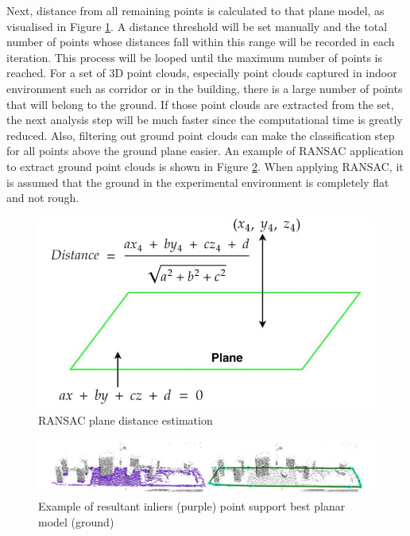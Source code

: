 Next, distance from all remaining points is calculated to that plane model, as visualised in Figure \ref{Chap3:Fig3}. A distance
threshold will be set manually and the total number of points whose distances fall within this range will be recorded in each iteration.
This process will be looped until the maximum number of points is reached. For a set of 3D point clouds, especially point clouds captured
in indoor environment such as corridor or in the building, there is a large number of points that will belong to the ground. If those
point clouds are extracted from the set, the next analysis step will be much faster since the computational
time is greatly reduced. Also, filtering out ground point clouds can make the classification step for all points above the ground
plane easier. An example of RANSAC application to extract ground point clouds is shown in Figure \ref{Chap3:Fig4}. When applying
RANSAC, it is assumed that the ground in the experimental environment is completely flat and not rough.

\begin{figure}[h]
    \centering
    \includegraphics[scale=0.6]{figures/chap3_fig/preprocess/ransac_plane.jpg}
    \caption{RANSAC plane distance estimation \cite{ransac_1}}
    \label{Chap3:Fig3}
\end{figure}


\begin{figure}[h]
    \centering
    \includegraphics[width=1.0\linewidth,scale=0.8]{figures/chap3_fig/preprocess/ransac_example.jpg}
    \caption{Example of resultant inliers (purple) point support best planar model (ground)  \cite{rusu_thesis}}
    \label{Chap3:Fig4}
\end{figure}

